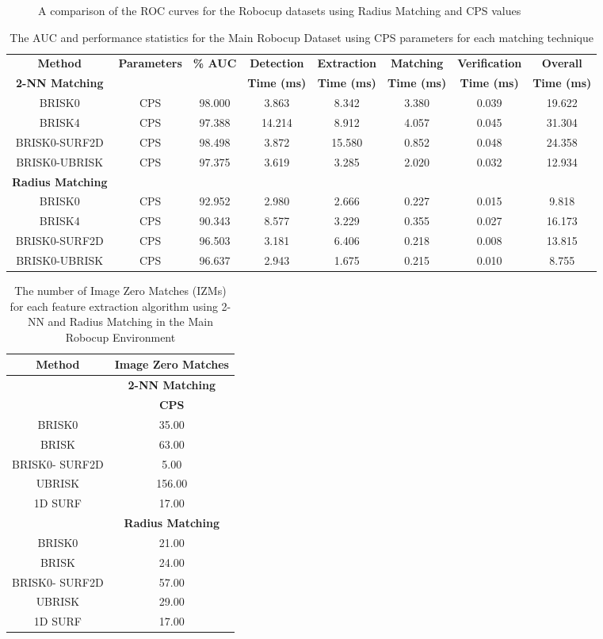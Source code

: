 \begin{figure}[ht!]
\begin{minipage}[b]{0.5\linewidth}
\caption{A comparison of the ROC curves for the Robocup datasets using Radius Matching and CPS values}
\label{fig:compareHammingConsistent}
\end{minipage}
\end{figure}


\begin{table}
\centering

\caption{The AUC and performance statistics for the Main Robocup Dataset using
CPS parameters for each matching technique}

\footnotesize
\begin{tabular}{|c|c|c|c|c|c|c|c|}
\hline 
\textbf{Method } & \textbf{Parameters} & \textbf{\% AUC} & \textbf{Detection} & \textbf{Extraction} & \textbf{Matching} & \textbf{Verification} & \textbf{Overall}\tabularnewline
\textbf{2-NN Matching} &  &  & \textbf{Time (ms)} & \textbf{Time (ms)} & \textbf{Time (ms)} & \textbf{Time (ms)} & \textbf{Time (ms)}\tabularnewline
\hline 
\hline 
BRISK0 & CPS & 98.000 & 3.863 & 8.342 & 3.380 & 0.039 & 19.622\tabularnewline
\hline 
BRISK4 & CPS & 97.388 & 14.214 & 8.912 & 4.057 & 0.045 & 31.304\tabularnewline
\hline 
BRISK0-SURF2D & CPS & 98.498 & 3.872 & 15.580 & 0.852 & 0.048 & 24.358\tabularnewline
\hline 
BRISK0-UBRISK & CPS & 97.375 & 3.619 & 3.285 & 2.020 & 0.032 & 12.934\tabularnewline
\hline 
\hline 
\textbf{Radius Matching} &  &  &  &  &  &  & \tabularnewline
\hline 
BRISK0 & CPS & 92.952 & 2.980 & 2.666 & 0.227 & 0.015 & 9.818\tabularnewline
\hline 
BRISK4 & CPS & 90.343 & 8.577 & 3.229 & 0.355 & 0.027 & 16.173\tabularnewline
\hline 
BRISK0-SURF2D & CPS & 96.503 & 3.181 & 6.406 & 0.218 & 0.008 & 13.815\tabularnewline
\hline 
BRISK0-UBRISK & CPS & 96.637 & 2.943 & 1.675 & 0.215 & 0.010 & 8.755\tabularnewline
\hline 
\end{tabular}
\label{app:mrd_hamming}
\end{table}

\begin{table}
\centering
\caption{The number of Image Zero Matches (IZMs) for each feature extraction
algorithm using 2-NN and Radius Matching in the Main Robocup Environment}
\begin{tabular}{|c|c|}
\hline 
\textbf{Method} & \multicolumn{1}{c|}{\textbf{Image Zero Matches}}\tabularnewline
\hline 
 & \multicolumn{1}{c|}{\textbf{2-NN Matching}}\tabularnewline
\hline 
 & \textbf{CPS}\tabularnewline
\hline 
\hline 
BRISK0 & 35.00\tabularnewline
\hline 
BRISK & 63.00\tabularnewline
\hline 
BRISK0- SURF2D & 5.00\tabularnewline
\hline 
UBRISK & 156.00\tabularnewline
\hline 
1D SURF & 17.00\tabularnewline
\hline 
 & \multicolumn{1}{c|}{\textbf{Radius Matching}}\tabularnewline
\hline 
BRISK0 & 21.00\tabularnewline
\hline 
BRISK & 24.00\tabularnewline
\hline 
BRISK0- SURF2D & 57.00\tabularnewline
\hline 
UBRISK & 29.00\tabularnewline
\hline 
1D SURF & 17.00\tabularnewline
\hline 
\end{tabular}
\label{app:mrd_izm}
\end{table}

